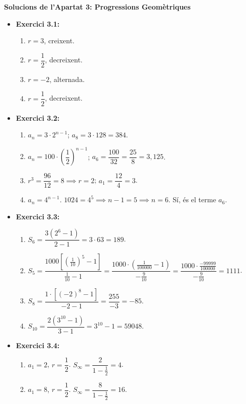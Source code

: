\documentclass[12pt]{article}
\begin{document}
\begin{solucio}
\textbf{Solucions de l'Apartat 3: Progressions Geomètriques}
\begin{itemize}
    \item \textbf{Exercici 3.1:}
    \begin{enumerate}[label=\alph*)]
        \item $r = 3$, creixent.
        \item $r = \dfrac{1}{2}$, decreixent.
        \item $r = -2$, alternada.
        \item $r = \dfrac{1}{2}$, decreixent.
    \end{enumerate}
    \item \textbf{Exercici 3.2:}
    \begin{enumerate}[label=\alph*)]
        \item $a_n = 3 \cdot 2^{n-1}$; $a_8 = 3 \cdot 128 = 384$.
        \item $a_n = 100 \cdot \left(\dfrac{1}{2}\right)^{n-1}$; $a_6 = \dfrac{100}{32} = \dfrac{25}{8} = 3{,}125$.
        \item $r^3 = \dfrac{96}{12} = 8 \implies r = 2$; $a_1 = \dfrac{12}{4} = 3$.
        \item $a_n = 4^{n-1}$. $1024 = 4^5 \implies n-1 = 5 \implies n = 6$. Sí, és el terme $a_6$.
    \end{enumerate}
    \item \textbf{Exercici 3.3:}
    \begin{enumerate}[label=\alph*)]
        \item $S_6 = \dfrac{3(2^6-1)}{2-1} = 3 \cdot 63 = 189$.
        \item $S_5 = \dfrac{1000\left[\left(\frac{1}{10}\right)^5 - 1\right]}{\frac{1}{10}-1} = \dfrac{1000 \cdot \left(\frac{1}{100000} - 1\right)}{-\frac{9}{10}} = \dfrac{1000 \cdot \frac{-99999}{100000}}{-\frac{9}{10}} = 1111$.
        \item $S_8 = \dfrac{1 \cdot [(-2)^8 - 1]}{-2-1} = \dfrac{255}{-3} = -85$.
        \item $S_{10} = \dfrac{2(3^{10}-1)}{3-1} = 3^{10} - 1 = 59048$.
    \end{enumerate}
    \item \textbf{Exercici 3.4:}
    \begin{enumerate}[label=\alph*)]
        \item $a_1 = 2$, $r = \dfrac{1}{2}$. $S_\infty = \dfrac{2}{1 - \frac{1}{2}} = 4$.
        \item $a_1 = 8$, $r = \dfrac{1}{2}$. $S_\infty = \dfrac{8}{1 - \frac{1}{2}} = 16$.

\end{enumerate}
\end{itemize}
\end{solucio}
\end{document}
